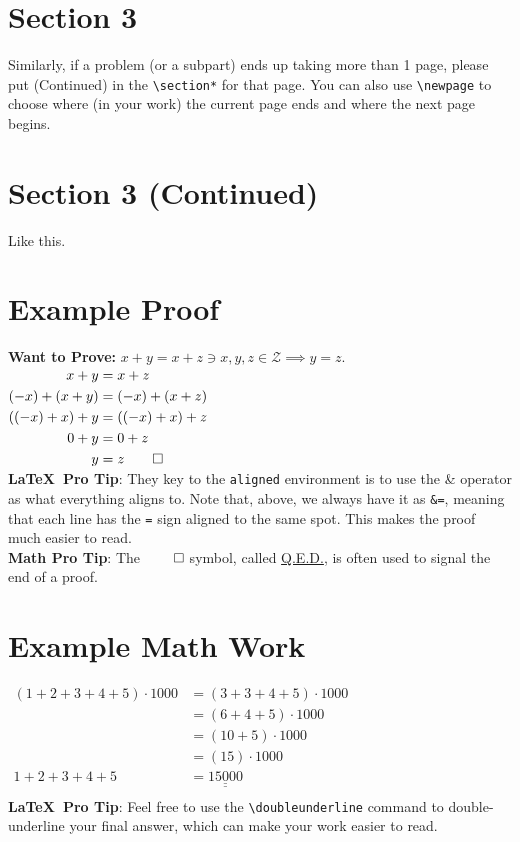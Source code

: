 \documentclass[letter]{amsart}
\def\doubleunderline#1{\underline{\underline{#1}}}
\begin{document}
\newpage

\section*{Section 3}
Similarly, if a problem (or a subpart) ends up taking more than 1 page, please put (Continued) in the \verb!\section*! for that page.  You can also use \verb!\newpage! to choose where (in your work) the current page ends and where the next page begins.
\newpage

\section*{Section 3 (Continued)}
Like this.
\newpage

\section*{Example Proof}
\noindent\textbf{Want to Prove:} $x+y=x+z \ni x,y,z \in \mathcal{Z} \implies y=z$.\vspace{0.5em}\\
$\begin{aligned}
x+y &= x + z\\
(-x)+(x+y) &= (-x)+(x+z)\\
((-x)+x)+y&=((-x)+x)+z\\
0+y &= 0+z\\
y &= z \qed
\end{aligned}$
\text{ }\vspace{2em}\\
\textbf{\LaTeX\ Pro Tip}: They key to the \texttt{aligned} environment is to use the \& operator as what everything aligns to.  Note that, above, we always have it as \texttt{\&=}, meaning that each line has the \texttt{=} sign aligned to the same spot.  This makes the proof much easier to read.\vspace{1em}\\
\textbf{Math Pro Tip}: The $\qed$ symbol, called \href{https://en.wikipedia.org/wiki/Q.E.D.}{Q.E.D.}, is often used to signal the end of a proof.
\newpage

\section*{Example Math Work}
$\begin{aligned}
(1 + 2 + 3 + 4 + 5) \cdot 1000 &= (3+3+4+5) \cdot 1000\\
&= (6+4+5) \cdot 1000\\
&= (10+5) \cdot 1000\\
&= (15) \cdot 1000\\
1 + 2 + 3 + 4 + 5 &= \doubleunderline{15000}\\
\end{aligned}$
\text{ }\vspace{2em}\\
\textbf{\LaTeX\ Pro Tip}: Feel free to use the \verb!\doubleunderline! command to double-underline your final answer, which can make your work easier to read.
\newpage
\end{document}
